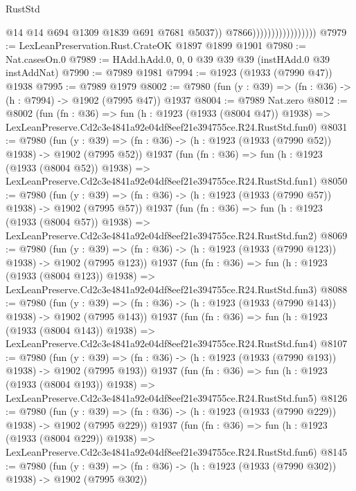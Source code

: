 \begin{lexlean}{RustStd}
\begin{coremodule}
                                          @14
                                          @14
                                          @694
                                          @1309
                                          @1839
                                          @691
                                          @7681
                                          @5037))
                                      @7866)))))))))))))))))
@7979 := LexLeanPreservation.Rust.CrateOK @1897 @1899 @1901
@7980 := Nat.casesOn.{0}
@7989 := HAdd.hAdd.{0, 0, 0} @39 @39 @39 (instHAdd.{0} @39 instAddNat)
@7990 := @7989 @1981
@7994 := @1923 (@1933 (@7990 @47)) @1938
@7995 := @7989 @1979
@8002 := @7980 (fun (y : @39) => (fn : @36) -> (h : @7994) -> @1902 (@7995 @47)) @1937
@8004 := @7989 Nat.zero
@8012 := @8002
    (fun (fn : @36) =>
    fun (h : @1923 (@1933 (@8004 @47)) @1938) =>
    LexLeanPreserve.Cd2c3e4841a92e04df8eef21e394755ce.R24.RustStd.fun0)
@8031 := @7980
    (fun (y : @39) => (fn : @36) -> (h : @1923 (@1933 (@7990 @52)) @1938) -> @1902 (@7995 @52))
    @1937
    (fun (fn : @36) =>
    fun (h : @1923 (@1933 (@8004 @52)) @1938) =>
    LexLeanPreserve.Cd2c3e4841a92e04df8eef21e394755ce.R24.RustStd.fun1)
@8050 := @7980
    (fun (y : @39) => (fn : @36) -> (h : @1923 (@1933 (@7990 @57)) @1938) -> @1902 (@7995 @57))
    @1937
    (fun (fn : @36) =>
    fun (h : @1923 (@1933 (@8004 @57)) @1938) =>
    LexLeanPreserve.Cd2c3e4841a92e04df8eef21e394755ce.R24.RustStd.fun2)
@8069 := @7980
    (fun (y : @39) => (fn : @36) -> (h : @1923 (@1933 (@7990 @123)) @1938) -> @1902 (@7995 @123))
    @1937
    (fun (fn : @36) =>
    fun (h : @1923 (@1933 (@8004 @123)) @1938) =>
    LexLeanPreserve.Cd2c3e4841a92e04df8eef21e394755ce.R24.RustStd.fun3)
@8088 := @7980
    (fun (y : @39) => (fn : @36) -> (h : @1923 (@1933 (@7990 @143)) @1938) -> @1902 (@7995 @143))
    @1937
    (fun (fn : @36) =>
    fun (h : @1923 (@1933 (@8004 @143)) @1938) =>
    LexLeanPreserve.Cd2c3e4841a92e04df8eef21e394755ce.R24.RustStd.fun4)
@8107 := @7980
    (fun (y : @39) => (fn : @36) -> (h : @1923 (@1933 (@7990 @193)) @1938) -> @1902 (@7995 @193))
    @1937
    (fun (fn : @36) =>
    fun (h : @1923 (@1933 (@8004 @193)) @1938) =>
    LexLeanPreserve.Cd2c3e4841a92e04df8eef21e394755ce.R24.RustStd.fun5)
@8126 := @7980
    (fun (y : @39) => (fn : @36) -> (h : @1923 (@1933 (@7990 @229)) @1938) -> @1902 (@7995 @229))
    @1937
    (fun (fn : @36) =>
    fun (h : @1923 (@1933 (@8004 @229)) @1938) =>
    LexLeanPreserve.Cd2c3e4841a92e04df8eef21e394755ce.R24.RustStd.fun6)
@8145 := @7980
    (fun (y : @39) => (fn : @36) -> (h : @1923 (@1933 (@7990 @302)) @1938) -> @1902 (@7995 @302))

\end{coremodule}
\end{lexlean}
